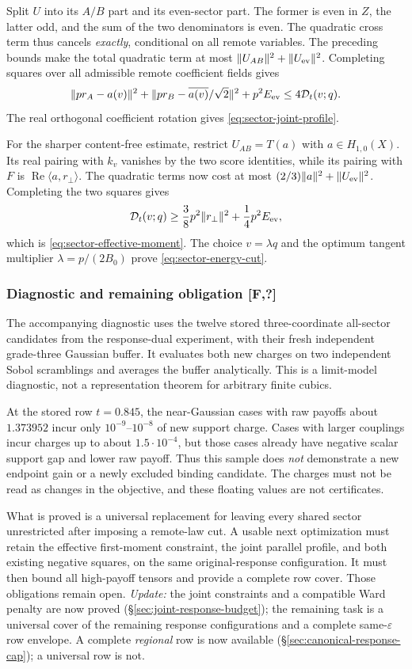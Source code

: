 Split $U$ into its $A/B$ part and its even-sector part. The former is
even in $Z$, the latter odd, and the sum of the two denominators is even.
The quadratic cross term thus cancels \emph{exactly}, conditional on
all remote variables. The preceding bounds make the total quadratic
term at most $\|U_{AB}\|^2+\|U_{\rm ev}\|^2$.
Completing squares over all admissible remote coefficient fields gives
\[
 \|p r_A-a(v)\|^2+
 \|p r_B-\overline{a(v)}/\sqrt2\|^2+p^2E_{\rm ev}
 \le4\mathcal D_t(v;q).
\]
The real orthogonal coefficient rotation gives
\eqref{eq:sector-joint-profile}.

For the sharper content-free estimate, restrict $U_{AB}=T(a)$ with
$a\in H_{1,0}(X)$. Its real pairing with $k_v$ vanishes by the two
score identities, while its pairing with $F$ is
$\operatorname{Re}\langle a,r_\perp\rangle$.
The quadratic terms now cost at most
$(2/3)\|a\|^2+\|U_{\rm ev}\|^2$. Completing the two squares gives
\[
 \mathcal D_t(v;q)\ge\frac38p^2\|r_\perp\|^2
                      +\frac14p^2E_{\rm ev},
\]
which is \eqref{eq:sector-effective-moment}.
The choice $v=\lambda q$ and the optimum tangent multiplier
$\lambda=p/(2B_0)$ prove \eqref{eq:sector-energy-cut}.

\subsubsection{Diagnostic and remaining obligation [F,?]}
The accompanying diagnostic uses the twelve stored three-coordinate
all-sector candidates from the response-dual experiment, with their fresh
independent grade-three Gaussian buffer. It evaluates both new charges
on two independent Sobol scramblings and averages the buffer analytically.
This is a limit-model diagnostic, not a representation theorem for
arbitrary finite cubics.

At the stored row $t=0.845$, the near-Gaussian cases with raw payoffs about
$1.373952$ incur only $10^{-9}$--$10^{-8}$ of new support charge. Cases
with larger couplings incur charges up to about $1.5\cdot10^{-4}$, but
those cases already have negative scalar support gap and lower raw payoff.
Thus this sample does \emph{not} demonstrate a new endpoint gain or a
newly excluded binding candidate. The charges must not be read as changes
in the objective, and these floating values are not certificates.

What is proved is a universal replacement for leaving every shared
sector unrestricted after imposing a remote-law cut. A usable next
optimization must retain the effective first-moment constraint, the
joint parallel profile, and both existing negative squares, on the
same original-response configuration. It must then bound all high-payoff
tensors and provide a complete row cover. Those obligations remain open. \emph{Update:} the joint constraints and a compatible Ward penalty are now proved
(\S\ref{sec:joint-response-budget}); the remaining task is a universal cover of the remaining response configurations and a complete same-$\varepsilon$ row envelope. A complete
\emph{regional} row is now available (\S\ref{sec:canonical-response-cap}); a universal row is not.

